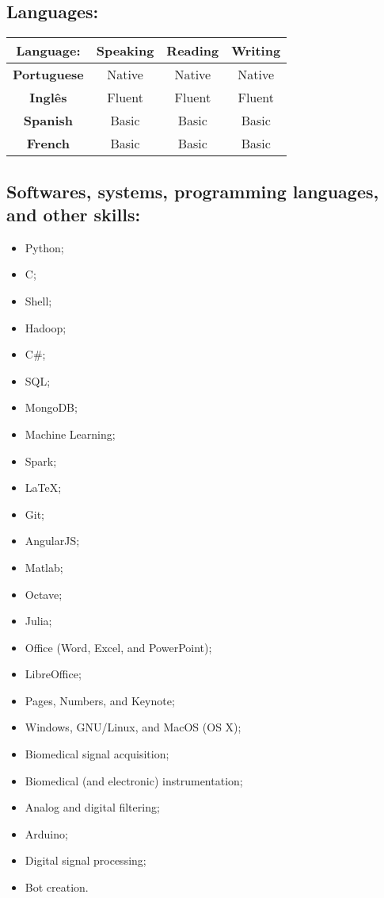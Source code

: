 \documentclass[11pt]{article}
\begin{document}
\subsection{Languages:}
\begin{center}
\begin{tabular}{c | c | c | c}
\hline
\textbf{Language:} & Speaking  & Reading & Writing \\
\hline
\hline
\textbf{Portuguese} &  Native & Native & Native  \\
\hline
\textbf{Inglês} &  Fluent & Fluent & Fluent  \\
\hline
\textbf{Spanish} & Basic & Basic & Basic \\
\hline
\textbf{French} & Basic & Basic & Basic \\
\hline
\end{tabular}
\end{center}

\newpage
\subsection{Softwares, systems, programming languages, and other skills:}
\begin{multicols}{3} %
\begin{itemize}
    \item Python;
    \item C;
    \item Shell;
    \item Hadoop;
    \item C\#;
    \item SQL;
    \item MongoDB;
    \item Machine Learning;
    \item Spark;
    \item \LaTeX ;
    \item Git;
    \item AngularJS;
    \item Matlab;
    \item Octave;
    \item Julia;
    \item Office (Word, Excel, and PowerPoint);
    \item LibreOffice;
    \item Pages, Numbers, and Keynote;
    \item Windows, GNU/Linux, and MacOS (OS X);
    \item Biomedical signal acquisition;
    \item Biomedical (and electronic) instrumentation;
    \item Analog and digital filtering;
    \item Arduino;
    \item Digital signal processing;
    \item Bot creation.
\end{itemize}
\end{multicols}
\end{document}
